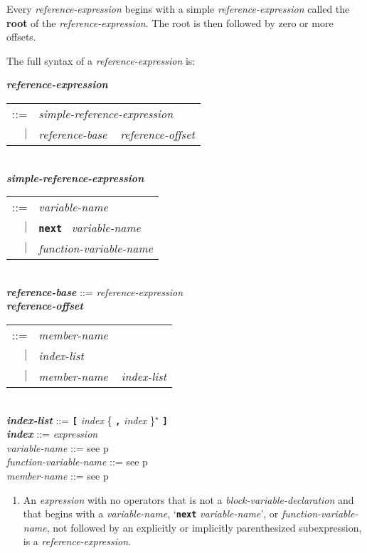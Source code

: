 \documentclass[12pt]{article}
\newcommand{\TT}[1]{{\tt \bfseries #1}}
\newcommand{\STAR}{{\Large $^\star$}}
\newcommand{\key}[1]{{\rm \bfseries #1}}
\newcommand{\emkey}[1]{{\em \bfseries #1}}
\newcommand{\pagref}[1]{p\pageref{#1}}
\newenvironment{indpar}[1][0.3in]%
	{\begin{list}{}%
		     {\setlength{\itemsep}{0in}%
		      \setlength{\topsep}{0in}%
		      \setlength{\parsep}{1ex}%
		      \setlength{\labelwidth}{#1}%
		      \setlength{\leftmargin}{#1}%
		      \addtolength{\leftmargin}{\labelsep}}%
	 \item}%
	{\end{list}}
\begin{document}
Every {\em reference-expression} begins with a simple
{\em reference-expression} called the \key{root} of the
{\em reference-expression}.  The root is then followed by zero or more
offsets.

The full syntax of a {\em reference-expression} is:

\begin{indpar}
\emkey{reference-expression}\label{REFERENCE-EXPRESSION}
    \begin{tabular}[t]{rl}
    ::= & {\em simple-reference-expression} \\
    $|$ & {\em reference-base} ~ {\em reference-offset} \\
    \end{tabular}
\\[0.5ex]
\emkey{simple-reference-expression}\label{SIMPLE-REFERENCE-EXPRESSION}
    \begin{tabular}[t]{rl}
    ::= & {\em variable-name} \\
    $|$ & \TT{next}~ {\em variable-name} \\
    $|$ & {\em function-variable-name} \\
    \end{tabular}
\\[0.5ex]
\emkey{reference-base}\label{REFERENCE-BASE}
    ::= {\em reference-expression}
\\[0.5ex]
\emkey{reference-offset}\label{REFERENCE-OFFSET}
    \begin{tabular}[t]{rl}
    ::= & {\em member-name} \\
    $|$ & {\em index-list} \\
    $|$ & {\em member-name} ~ {\em index-list} \\
    \end{tabular}
\\[0.5ex]
\emkey{index-list} ::= \TT{[} {\em index} \{ \TT{,} {\em index} \}\STAR{} \TT{]}
\\[0.5ex]
\emkey{index}\label{REFERENCE-INDEX}
    ::= {\em expression}
\\[0.5ex]
{\em variable-name} ::= see \pagref{VARIABLE-NAME}
\\[0.5ex]
{\em function-variable-name} ::= see \pagref{FUNCTION-VARIABLE-NAME}
\\[0.5ex]
{\em member-name} ::= see \pagref{MEMBER-NAME}
\begin{enumerate}
\item
An {\em expression} with no operators that is not a
{\em block-variable-declaration} and that begins
with a {\em variable-name}, `\TT{next} {\em vari\-able-name}',
or {\em function-variable-name},
not followed
by an explicitly or implicitly parenthesized subexpression,
is a {\em reference-expression}.


\end{enumerate}
\end{indpar}
\end{document}
